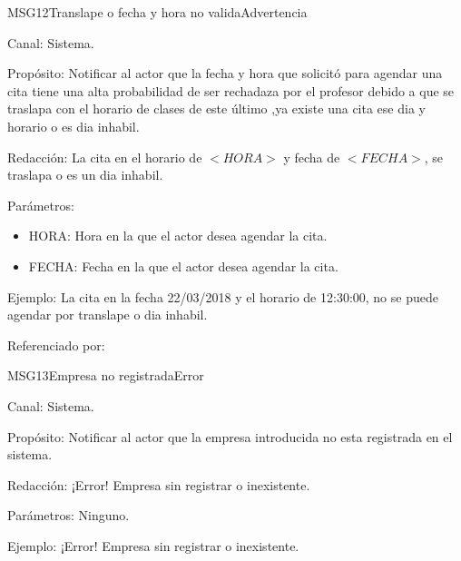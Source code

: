 \begin{mensaje}{MSG12}{Translape o fecha y hora no valida}{Advertencia}
	\item[Canal:] Sistema.
	\item[Propósito:] Notificar al actor que la fecha y hora que solicitó para agendar una cita tiene
	una alta probabilidad de ser rechadaza por el profesor debido a que se traslapa con el horario de
	clases de este último ,ya existe una cita ese dia y horario o es dia inhabil.
	\item[Redacción:] La cita en el horario de $<HORA>$ y fecha de $<FECHA>$, se traslapa o es un dia inhabil.
	\item[Parámetros:] 
		\begin{itemize}
			\item HORA: Hora en la que el actor desea agendar la cita.
			\item FECHA: Fecha en la que el actor desea agendar la cita.
		\end{itemize}
	\item[Ejemplo:] La cita en la fecha 22/03/2018 y el horario de 12:30:00, no se puede agendar por translape o dia inhabil.
	\item[Referenciado por:] %
\end{mensaje}

\begin{mensaje}{MSG13}{Empresa no registrada}{Error}
\item[Canal:] Sistema.
	\item[Propósito:] Notificar al actor que la empresa introducida no esta registrada en el sistema.
	\item[Redacción:] ¡Error! Empresa sin registrar o inexistente.
	\item[Parámetros:] Ninguno.
	\item[Ejemplo:] ¡Error! Empresa sin registrar o inexistente.
	
\end{mensaje}

